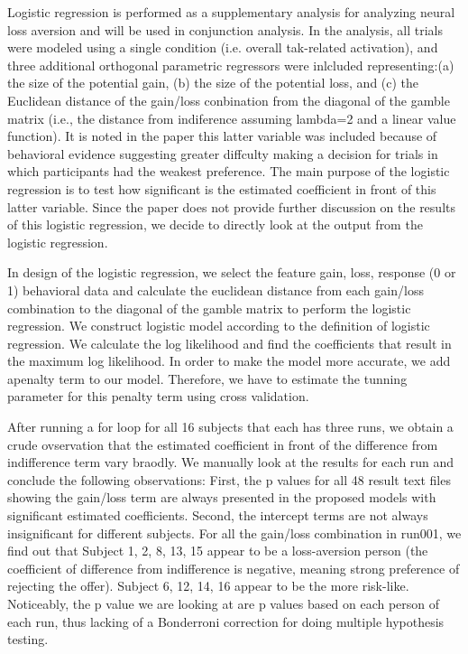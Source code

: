 \par \indent Logistic regression is performed as a supplementary analysis for
analyzing neural loss aversion and will be used in conjunction analysis. In 
the analysis, all trials were modeled using a single condition (i.e. overall
tak-related activation), and three additional orthogonal parametric regressors
were inlcluded representing:(a) the size of the potential gain, (b) the size
of the potential loss, and (c) the Euclidean distance of the gain/loss 
conbination from the diagonal of the gamble matrix (i.e., the distance from 
indiference assuming lambda=2 and a linear value function). It is noted in 
the paper this latter variable was included because of behavioral evidence 
suggesting greater diffculty making a decision for trials in which participants
had the weakest preference. The main purpose of the logistic regression is to
test how significant is the estimated coefficient in front of this latter
variable. Since the paper does not provide further discussion on the results
of this logistic regression, we decide to directly look at the output from the
logistic regression. 

\par \indent In design of the logistic regression, we select the feature gain, 
loss, response (0 or 1) behavioral data and calculate the euclidean distance 
from each gain/loss combination to the diagonal of the gamble matrix to 
perform the logistic regression. We construct logistic model according to 
the definition of logistic regression. We calculate the log likelihood and 
find the coefficients that result in the maximum log likelihood. In order 
to make the model more accurate, we add apenalty term to our model. Therefore, 
we have to estimate the tunning parameter for this penalty term using cross 
validation.

\par \indent After running a for loop for all 16 subjects that each has three
runs, we obtain a crude ovservation that the estimated coefficient in front of
the difference from indifference term vary braodly. We manually look at the 
results for each run and conclude the following observations: 
First, the p values for all 48 result text files showing the gain/loss term
are always presented in the proposed models with significant estimated 
coefficients. Second, the intercept terms are not always insignificant for 
different subjects. For all the gain/loss combination in run001, we find out 
that Subject 1, 2, 8, 13, 15 appear to be a loss-aversion person (the 
coefficient of difference from indifference is negative, meaning strong 
preference of rejecting the offer). Subject 6, 12, 14, 16 appear to be the 
more risk-like. 
Noticeably, the p value we are looking at are p values based on each person of
each run, thus lacking of a Bonderroni correction for doing multiple hypothesis 
testing.  



